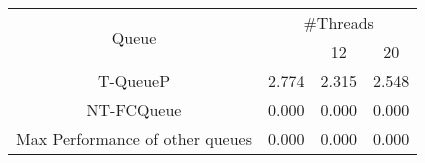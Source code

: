 \begin{tabular}{|c|c|c|c|}
\hline
\multirow{2}{*}{Queue} & \multicolumn{3}{c|}{\#Threads}\\\cline{2-4}& \quad 4 & 12 & 20\\
\hline
\hline
T-QueueP & 2.774 & 2.315 & 2.548\\
NT-FCQueue & 0.000 & 0.000 & 0.000\\
Max Performance of other queues & 0.000 & 0.000 & 0.000\\
\hline\end{tabular}
